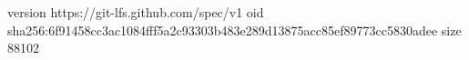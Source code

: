 version https://git-lfs.github.com/spec/v1
oid sha256:6f91458cc3ac1084fff5a2c93303b483e289d13875acc85ef89773cc5830adee
size 88102
